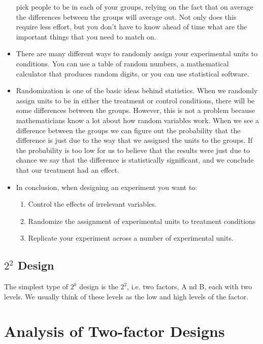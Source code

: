 \begin{itemize}
	pick people to be in each of your groups, relying on the fact that on average the differences between
	the groups will average out. Not only does this require less effort, but you don't have to know ahead
	of time what are the important things that you need to match on.
	\item There are many different ways to randomly assign your experimental units to conditions. You can use
	a table of random numbers, a mathematical calculator that produces random digits, or you can use
	statistical software.
	\item Randomization is one of the basic ideas behind statistics. When we randomly assign units to be in
	either the treatment or control conditions, there will be some differences between the groups. However,
	this is not a problem because mathematicians know a lot about how random variables work. When we
	see a difference between the groups we can figure out the probability that the difference is just due to
	the way that we assigned the units to the groups. If the probability is too low for us to believe that the
	results were just due to chance we say that the difference is statistically significant, and we conclude
	that our treatment had an effect.
	\item In conclusion, when designing an experiment you want to:
	\begin{enumerate}
		\item Control the effects of irrelevant variables.
		\item Randomize the assignment of experimental units to treatment conditions
		\item Replicate your experiment across a number of experimental units.
	\end{enumerate}
\end{itemize}




\subsection{ $2^2$ Design}

The simplest type of $2^k$ design is the $2^2$, i.e. two factors, A nd B, each with two levels. We usually think of these levels as the low and high levels of the factor.


\section{Analysis of Two-factor Designs}

